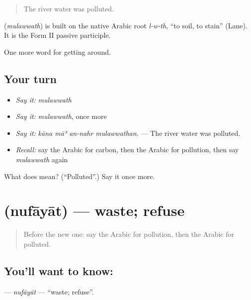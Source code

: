 \begin{quote}
The river water was polluted.
\end{quote}

\begin{cousinweb}
\textbf{} (\emph{mulawwath}) is built on the native Arabic root \emph{l-w-th}, \textquotedblleft{}to soil, to stain\textquotedblright{} (Lane). It is the Form II passive participle.
\end{cousinweb}

\begin{grammarlens}[title={What you've built}]
One more word for getting around.
\end{grammarlens}

\subsection*{Your turn}
\begin{itemize}
\raggedright
  \item \emph{Say it:} \emph{mulawwath}
  \item \emph{Say it:} \emph{mulawwath}, once more
  \item \emph{Say it:} \emph{kāna māʾ an-nahr mulawwathan.} — The river water was polluted.
  \item \emph{Recall:} say the Arabic for carbon, then the Arabic for pollution, then say \emph{mulawwath} again
\end{itemize}

\begin{tcolorbox}[breakable,colback=teal!4,colframe=teal!35!black,title={Before you move on}]
What does  mean? (\textquotedblleft{}Polluted\textquotedblright{}.) Say it once more.
\end{tcolorbox}
\section[\texorpdfstring{\ar{نفايات} (nufāyāt)}{نفايات (nufāyāt)}]{ (nufāyāt) — waste; refuse}

\label{lesson:AR-C464-nufayat}



\begin{quote}
Before the new one: say the Arabic for pollution, then the Arabic for polluted.
\end{quote}

\subsection*{You'll want to know: }
\textbf{} — \emph{nufāyāt} — \textquotedblleft{}waste; refuse\textquotedblright{}.

